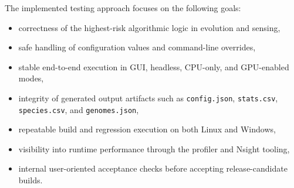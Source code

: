 The implemented testing approach focuses on the following goals:

\begin{itemize}[nosep]
	\item correctness of the highest-risk algorithmic logic in evolution and sensing,
	\item safe handling of configuration values and command-line overrides,
	\item stable end-to-end execution in GUI, headless, CPU-only, and GPU-enabled modes,
	\item integrity of generated output artifacts such as \texttt{config.json},
	      \texttt{stats.csv}, \texttt{species.csv}, and \texttt{genomes.json},
	\item repeatable build and regression execution on both Linux and Windows,
	\item visibility into runtime performance through the profiler and Nsight tooling,
	\item internal user-oriented acceptance checks before accepting release-candidate builds.
\end{itemize}
